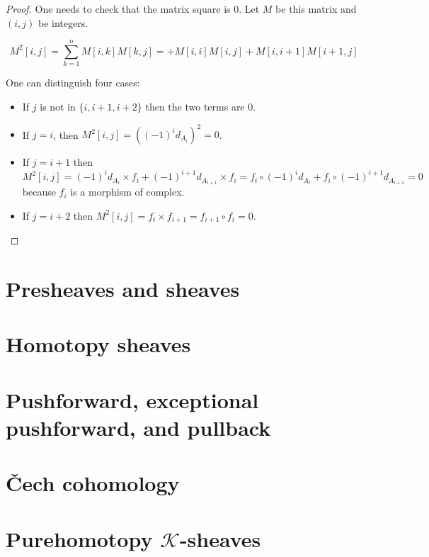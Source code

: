 \begin{proof}
    One needs to check that the matrix square is $0$. Let $M$ be this matrix and $(i,j)$ be integers.

    $$M^2[i,j]=\sum\limits_{k=1}^nM[i,k]M[k,j]=+ M[i,i] M[i,j]+M[i,i+1]M[i+1,j]$$

    One can distinguish four cases:\begin{itemize}

        \item If $j$ is not in $\{i,i+1,i+2\}$ then the two terms are $0$. 
        \item If $j=i$, then $M^2[i,j]=((-1)^id_{A_i})^2=0$. 
        \item If $j=i+1$ then $M^2[i,j]=(-1)^id_{A_i}\times f_i+ (-1)^{i+1}d_{A_{i+1}}\times f_i=f_i\circ (-1)^id_{A_i}+ f_i\circ (-1)^{i+1}d_{A_{i+1}}=0$ because $f_i$ is a morphism of complex.
        \item If $j=i+2$ then $M^2[i,j]=f_i\times f_{i+1}=f_{i+1}\circ f_i=0$.
    \end{itemize}

\end{proof}

\chapter{Presheaves and sheaves}



\chapter{Homotopy sheaves}



\chapter{Pushforward, exceptional pushforward, and pullback}



\chapter{\v{C}ech cohomology}



\chapter{Purehomotopy $\mathcal{K}$-sheaves}

